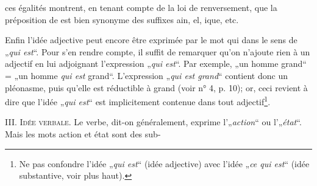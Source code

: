{      \noindent
      ces égalités montrent, en tenant compte de la loi de
      renversement, que la préposition \textup{de} est bien synonyme
      des suffixes \textup{ain}, \textup{el}, \textup{ique}, etc.

      Enfin l’idée adjective peut encore être exprimée par le mot
      \textup{qui} dans le sens de „\emph{qui est}“. Pour s’en rendre
      compte, il suffit de remarquer qu’on n’ajoute rien à un adjectif
      en lui adjoignant l’expression „\emph{qui est}“. Par exemple,
      „un homme grand“ = „un homme \emph{qui est} grand“. L’expression
      „\emph{qui est grand}“ contient donc un pléonasme, puis qu’elle
      est réductible à \textup{grand} (voir n° 4, p. 10); or, ceci
      revient à dire que l’idée „\emph{qui est}“ est implicitement
      contenue dans tout adjectif\footnote{Ne pas confondre l’idée
        „\emph{qui est}“ (idée adjective) avec l’idée „\emph{ce qui
          est}“ (idée substantive, voir plus haut).}.

      III. \textsc{Idée verbale}. Le verbe, dit-on généralement,
      exprime l'„\emph{action}“ ou l'„\emph{état}“. Mais les mots
      \textup{action} et \textup{état} sont des sub-
  }
  
